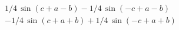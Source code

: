 \begin{multline*}
1/4\,\sin \left( c+a-b \right) -1/4\,\sin \left( -c+a-b \right) \\
-1/4\,\sin \left( c+a+b \right) +1/4\,\sin \left( -c+a+b \right)
\end{multline*}
